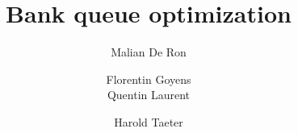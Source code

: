 \documentclass[10pt]{beamer}
\title{Bank queue optimization}
\author[Malian DR, Florentin G, Quentin L, Harlod T]{
  \small
  Malian De Ron
  \and
  Florentin Goyens
  \\
  Quentin Laurent
  \and
  Harold Taeter
}
\begin{document}
\begin{frame}
  \maketitle
\end{frame}


\end{document}
